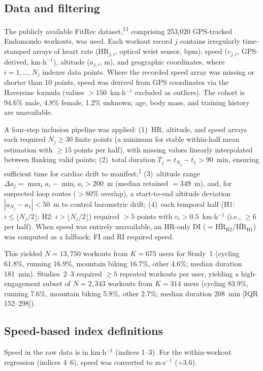 \documentclass[12pt]{article}
\begin{document}
\subsection{Data and filtering}
The publicly available FitRec dataset,\textsuperscript{11} comprising
253,020 GPS-tracked Endomondo workouts, was used. Each workout record $j$
contains irregularly time-stamped arrays of heart rate
($\mathrm{HR}_{j,i}$, optical wrist sensor, bpm), speed ($v_{j,i}$,
GPS-derived, km$\cdot$h$^{-1}$), altitude ($a_{j,i}$, m), and geographic
coordinates, where $i = 1,\dots,N_j$ indexes data points. Where the
recorded speed array was missing or shorter than 10 points, speed was
derived from GPS coordinates via the Haversine formula (values
$>150$~km$\cdot$h$^{-1}$ excluded as outliers). The cohort is 94.6\% male,
4.8\% female, 1.2\% unknown; age, body mass, and training history are
unavailable.

A four-step inclusion pipeline was applied: (1)~HR, altitude, and speed
arrays each required $N_j \geq 30$ finite points (a minimum for stable
within-half mean estimation with $\geq 15$ points per half), with missing
values linearly interpolated between flanking valid points; (2)~total
duration $T_j = t_{N_j}-t_1 > 90$~min, ensuring sufficient time for
cardiac drift to manifest;\textsuperscript{1} (3)~altitude range
$\Delta a_j = \max_i a_i - \min_i a_i > 200$~m (median retained $= 349$~m),
and, for suspected loop routes ($>80\%$ overlap), a start-to-end altitude
deviation $|a_{N_j}-a_1| < 50$~m to control barometric drift; (4)~each
temporal half (H1: $i \leq \lfloor N_j/2\rfloor$; H2: $i > \lfloor
N_j/2\rfloor$) required $>5$ points with $v_i > 0.5$~km$\cdot$h$^{-1}$
(i.e., $\geq 6$ per half). When speed was entirely unavailable, an
HR-only DI ($=\bar{\mathrm{HR}}_{\mathrm{H2}}/\bar{\mathrm{HR}}_{\mathrm{H1}}$)
was computed as a fallback; FI and RI required speed.

This yielded $N = 13{,}750$ workouts from $K = 675$ users for Study~1
(cycling 61.8\%, running 16.9\%, mountain biking 16.7\%, other 4.6\%;
median duration 181~min). Studies~2--3 required $\geq 5$ repeated workouts
per user, yielding a high-engagement subset of $N = 2{,}343$ workouts from
$K = 314$ users (cycling 83.9\%, running 7.6\%, mountain biking 5.8\%,
other 2.7\%; median duration 208~min [IQR 152--298]).

\subsection{Speed-based index definitions}
Speed in the raw data is in km$\cdot$h$^{-1}$ (indices 1--3). For the
within-workout regression (indices 4--6), speed was converted to
m$\cdot$s$^{-1}$ ($\div 3.6$).
\end{document}
